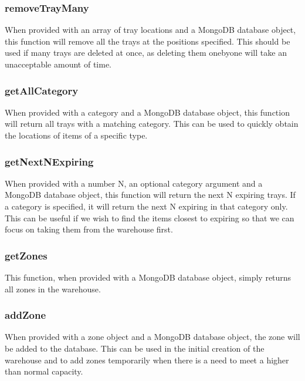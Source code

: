 \documentclass[letterpaper,10pt,english]{sphinxmanual}
\begin{document}
\subsubsection{removeTrayMany}
\label{\detokenize{docs/System_Overview/Backend_overview:removetraymany}}
When provided with an array of tray locations and a MongoDB database
object, this function will remove all the trays at the positions
specified. This should be used if many trays are deleted at once, as
deleting them one\sphinxhyphen{}by\sphinxhyphen{}one will take an unacceptable amount of time.


\subsubsection{getAllCategory}
\label{\detokenize{docs/System_Overview/Backend_overview:getallcategory}}
When provided with a category and a MongoDB database object, this
function will return all trays with a matching category. This can be
used to quickly obtain the locations of items of a specific type.


\subsubsection{getNextNExpiring}
\label{\detokenize{docs/System_Overview/Backend_overview:getnextnexpiring}}
When provided with a number N, an optional category argument and a
MongoDB database object, this function will return the next N expiring
trays. If a category is specified, it will return the next N expiring in
that category only. This can be useful if we wish to find the items
closest to expiring so that we can focus on taking them from the
warehouse first.


\subsubsection{getZones}
\label{\detokenize{docs/System_Overview/Backend_overview:getzones}}
This function, when provided with a MongoDB database object, simply
returns all zones in the warehouse.


\subsubsection{addZone}
\label{\detokenize{docs/System_Overview/Backend_overview:addzone}}
When provided with a zone object and a MongoDB database object, the zone
will be added to the database. This can be used in the initial creation
of the warehouse and to add zones temporarily when there is a need to
meet a higher than normal capacity.
\end{document}
